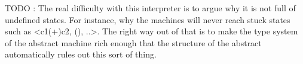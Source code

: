 \documentclass{llncs}
\begin{document}
\begin{center}
\end{center}


\begin{center}
\end{center}



TODO : The real difficulty with this interpreter is to argue why it is
not full of undefined states. For instance, why the machines will
never reach stuck states such as {{<c1(+)c2, (), ..>}}.  The right way
out of that is to make the type system of the abstract machine rich
enough that the structure of the abstract automatically rules out this
sort of thing. 
\end{document}
